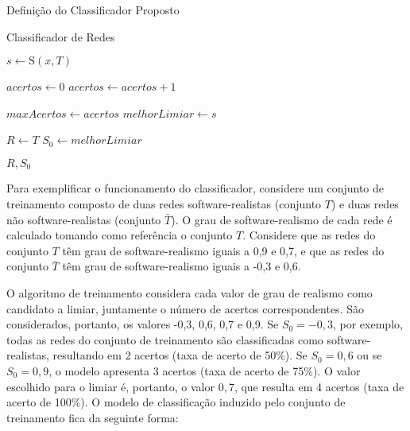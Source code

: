 \begin{section}{Definição do Classificador Proposto}
\begin{subsection}{Classificador de Redes}
\begin{algorithm}
\begin{algorithmic}
	\STATE $s \gets \mathrm{S}(x, T)$
	
	\STATE $acertos \gets 0$
			\STATE $acertos \gets acertos + 1$
		\ENDIF
	\ENDFOR
	
		\STATE $maxAcertos \gets acertos$
		\STATE $melhorLimiar \gets s$
	\ENDIF
\ENDFOR

\STATE $R \gets T$
\STATE $S_0 \gets melhorLimiar$

\RETURN $R, S_0$
\end{algorithmic}	
\end{algorithm}

	 
	
Para exemplificar o funcionamento do classificador, considere um conjunto de treinamento composto de duas redes software-realistas (conjunto $T$) e duas redes não software-realistas (conjunto $\bar{T}$). O grau de software-realismo de cada rede é calculado tomando como referência o conjunto $T$. Considere que as redes do conjunto $T$ têm grau de software-realismo iguais a 0,9 e 0,7, e que as redes do conjunto $\bar{T}$ têm grau de software-realismo iguais a -0,3 e 0,6.

O algoritmo de treinamento considera cada valor de grau de realismo como candidato a limiar, juntamente o número de acertos correspondentes. São considerados, portanto, os valores -0,3, 0,6, 0,7 e 0,9. Se $S_0 = -0,3$, por exemplo, todas as redes do conjunto de treinamento são classificadas como software-realistas, resultando em 2 acertos (taxa de acerto de 50\%). Se $S_0 = 0,6$ ou se $S_0 = 0,9$, o modelo apresenta 3 acertos (taxa de acerto de 75\%). O valor escolhido para o limiar é, portanto, o valor $0,7$, que resulta em 4 acertos (taxa de acerto de 100\%). O modelo de classificação induzido pelo conjunto de treinamento fica da seguinte forma:


\end{subsection}
\end{section}
